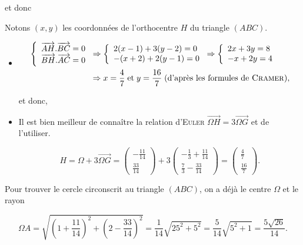 {\begin{enumerate}
{et donc 


Notons $(x,y)$ les coordonnées de l'orthocentre $H$ du triangle $(ABC)$.

\begin{itemize}
\item[\textbf{1ère solution.}]

\begin{align*}
\left\{
\begin{array}{l}
\overrightarrow{AH}.\overrightarrow{BC}=0\\
\overrightarrow{BH}.\overrightarrow{AC}=0
\end{array}
\right.&
\Rightarrow
\left\{
\begin{array}{l}
2(x-1)+3(y-2)=0\\
-(x+2)+2(y-1)=0
\end{array}
\right.
\Rightarrow
\left\{
\begin{array}{l}
2x+3y=8\\
-x+2y=4
\end{array}
\right.\\
 &\Rightarrow x=\frac{4}{7}\;\mbox{et}\;y=\frac{16}{7}\;(\mbox{d'après les formules de \textsc{Cramer}}),
\end{align*}

et donc, 
\item[\textbf{2ème solution.}] Il est bien meilleur de connaître la relation d'\textsc{Euler} $\overrightarrow{\Omega H}=3\overrightarrow{\Omega G}$ et de l'utiliser.

$$H=\Omega+3\overrightarrow{\Omega G}
=\left(
\begin{array}{c}
-\frac{11}{14}\\
\frac{33}{14}
\end{array}
\right)+3\left(
\begin{array}{c}
-\frac{1}{3}+\frac{11}{14}\\
\frac{7}{3}-\frac{33}{14}
\end{array}
\right)
=
\left(
\begin{array}{c}
\frac{4}{7}\\
\frac{16}{7}
\end{array}
\right).$$

\end{itemize}

Pour trouver le cercle circonscrit au triangle $(ABC)$, on a déjà le centre $\Omega$ et le rayon 

$$\Omega A=\sqrt{(1+\frac{11}{14})^2+(2-\frac{33}{14})^2}=\frac{1}{14}\sqrt{25^2+5^2}=\frac{5}{14}\sqrt{5^2+1}=\frac{5\sqrt{26}}{14}.$$

}
\end{enumerate}}
